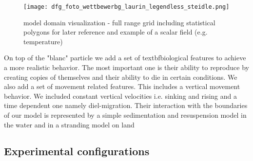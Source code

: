 \begin{figure}
    \texttt{[image: dfg\_foto\_wettbewerbg\_laurin\_legendless\_steidle.png]}
    \caption{model domain visualization - full range grid including statistical polygons for later reference and example of a scalar field (e.g. temperature)}
    \label{fig:statistial polygons}
\end{figure}

On top of the "blanc" particle we add a set of textbf{biological features} to achieve a more realistic behavior.
The most important one is their ability to reproduce by creating copies of themselves 
and their ability to die in certain conditions.
We also add a set of movement related features. 
This includes a vertical movement behavior. 
We included constant vertical velocities i.e. sinking and rising and a time dependent one namely diel-migration.
Their interaction with the boundaries of our model is represented by a simple sedimentation and resuspension model in the water and in a stranding model on land





\subsection*{Experimental configurations}



